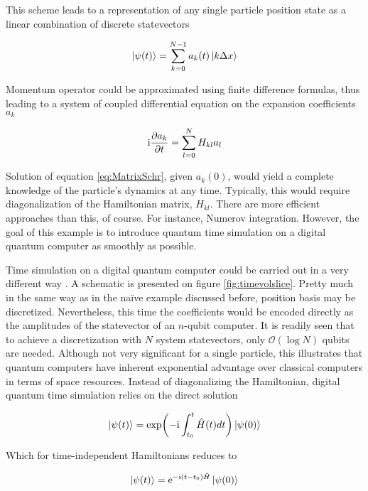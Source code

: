   This scheme leads to a representation of any single particle position state as a linear combination of discrete statevectors

  \begin{equation}
    \ket{\psi(t)} = \sum_{k = 0}^{N-1} a_k(t) \ket{k \Delta x}
  \end{equation}

  Momentum operator could be approximated using finite difference formulas, thus leading to a system of coupled differential equation on the expansion coefficients $a_k$

  \begin{equation}
    \mathrm{i}\pdv{a_k}{t} = \sum_{l = 0}^{N} H_{kl} a_l
    \label{eq:MatrixSchr}
  \end{equation}

  Solution of equation \ref{eq:MatrixSchr}, given $a_k(0)$, would yield a complete knowledge of the particle's dynamics at any time. Typically, this would require diagonalization of the Hamiltonian matrix, $H_{kl}$. There are more efficient approaches than this, of course. For instance, Numerov integration. However, the goal of this example is to introduce quantum time simulation on a digital quantum computer as smoothly as possible.

  Time simulation on a digital quantum computer could be carried out in a very different way \cite{Strini, Nielsen}. A schematic is presented on figure \ref{fig:timevolslice}. Pretty much in the same way as in the naïve example discussed before, position basis may be discretized. Nevertheless, this time the coefficients would be encoded directly as the amplitudes of the statevector of an $n$-qubit computer. It is readily seen that to achieve a discretization with $N$ system statevectors, only $\mathcal{O}(\log{N})$ qubits are needed. Although not very significant for a single particle, this illustrates that quantum computers have inherent exponential advantage over classical computers in terms of space resources. Instead of diagonalizing the Hamiltonian, digital quantum time simulation relies on the direct solution

  \begin{equation}
    \ket{\psi(t)} = \exp(-\mathrm{i}\int_{t_0}^t \hat{H}(t)dt)\ket{\psi(0)}
    \label{eq:UnitaryEvolution}
  \end{equation}

  Which for time-independent Hamiltonians reduces to

  \begin{equation}
    \ket{\psi(t)} = \mathrm{e}^{-\mathrm{i}(t - t_0) \hat{H}}\ket{\psi(0)}
    \label{eq:UnitaryEvolutionNoTime}
  \end{equation}

